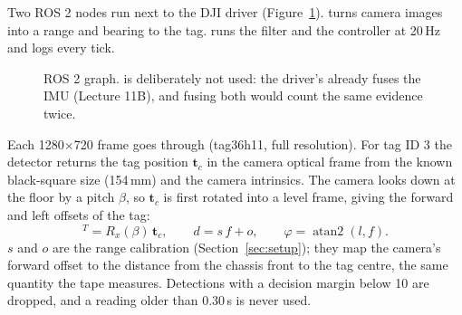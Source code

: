 \label{sec:method}

Two ROS 2 nodes run next to the DJI driver (Figure~\ref{fig:arch}).  turns camera images into a
range and bearing to the tag.  runs the filter and the controller at 20\,Hz and logs every tick.

\begin{figure}[H]
\centering
{}
\caption{ROS 2 graph.  is deliberately not used: the driver's  already fuses the IMU
(Lecture 11B), and fusing both would count the same evidence twice.}
\label{fig:arch}
\end{figure}

Each 1280$\times$720 frame goes through  (tag36h11, full resolution). For tag ID 3 the detector
returns the tag position $\mathbf t_c$ in the camera optical frame from the known black-square size (154\,mm) and the
camera intrinsics. The camera looks down at the floor by a pitch $\beta$, so $\mathbf t_c$ is first rotated into a level
frame, giving the forward and left offsets of the tag:
\begin{equation}
  [\,f,\ l,\ u\,]^T = R_x(\beta)\,\mathbf t_c, \qquad
  d = s\,f + o, \qquad \varphi = \operatorname{atan2}(l, f).
\end{equation}
$s$ and $o$ are the range calibration (Section~\ref{sec:setup}); they map the camera's forward offset to the distance
from the chassis front to the tag centre, the same quantity the tape measures. Detections with a decision margin below
10 are dropped, and a reading older than 0.30\,s is never used.


